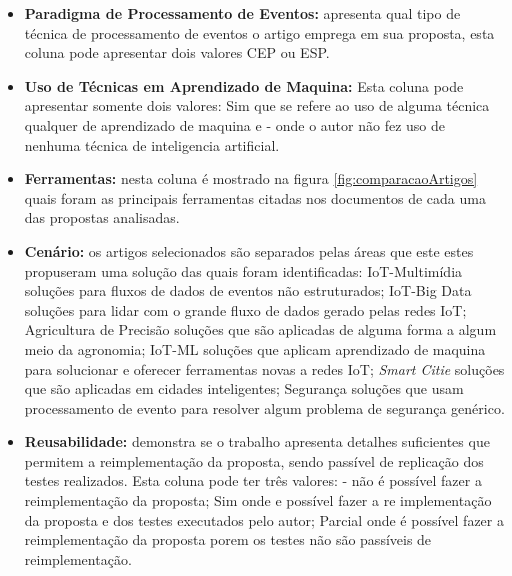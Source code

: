 \documentclass[ti,table]{texufpel} %
\begin{document}
\begin{itemize}
	
	\item \textbf{Paradigma de Processamento de Eventos:}
	apresenta qual tipo de técnica de processamento de eventos o artigo emprega em sua proposta, esta coluna pode apresentar dois valores CEP ou ESP. 
		
	
	\item \textbf{Uso de Técnicas em Aprendizado de Maquina:} Esta coluna pode apresentar somente dois valores: Sim que se refere ao uso de alguma técnica qualquer de aprendizado de maquina e - onde o autor não fez uso de nenhuma técnica de inteligencia artificial. 
	
	\item \textbf{Ferramentas:} nesta coluna é mostrado na figura \ref{fig:comparacaoArtigos} quais foram as principais ferramentas citadas nos documentos de cada uma das propostas analisadas.
	
    \item \textbf{Cenário:} os artigos selecionados são separados pelas áreas que este estes propuseram uma solução das quais foram identificadas: IoT-Multimídia soluções para fluxos de dados de eventos não estruturados; IoT-Big Data soluções para lidar com o grande fluxo de dados gerado pelas redes IoT; Agricultura de Precisão soluções que são aplicadas de alguma forma a algum meio da agronomia; IoT-ML soluções que aplicam aprendizado de maquina para solucionar e oferecer ferramentas novas a redes IoT; \textit{Smart Citie} soluções que são aplicadas em cidades inteligentes; Segurança soluções que usam processamento de evento para resolver algum problema de segurança genérico. 
    
     \item \textbf{Reusabilidade:} demonstra se o trabalho apresenta detalhes suficientes que
      permitem a reimplementação da proposta, sendo passível de replicação dos testes realizados. Esta coluna pode ter três valores: - não é possível fazer a reimplementação da proposta; Sim onde e possível fazer a re implementação da proposta e dos testes executados pelo autor; Parcial onde é possível fazer a reimplementação da proposta porem os testes não são passíveis de reimplementação.
  
\end{itemize}
\end{document}
